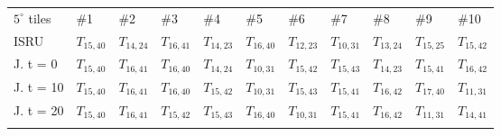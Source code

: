 \documentclass[utf8]{FrontiersinHarvard} %
\begin{document}
\begin{table}[h!]
\begin{tabular}{lllllllllll}
$5^{\circ}$ tiles  & \#1                                  & \#2                                  & \#3                                  & \#4                                  & \#5                                  & \#6                                  & \#7                                  & \#8                                  & \#9                                  & \#10                                 \\
ISRU               & \cellcolor[HTML]{00FF00}$T_{15,40}$  & \cellcolor[HTML]{88FF00}$T_{14,24}$  & \cellcolor[HTML]{B8FF00}$T_{16,41}$  & \cellcolor[HTML]{E8FF00}$T_{14,23}$  & \cellcolor[HTML]{FFFF00}$T_{16,40}$  & \cellcolor[HTML]{FFEE00}$T_{12,23}$  & \cellcolor[HTML]{FFDD00}$T_{10,31}$  & \cellcolor[HTML]{FFCC00}$T_{13,24}$  & \cellcolor[HTML]{FFBB00}$T_{15,25}$  & \cellcolor[HTML]{FFAA00}$T_{15,42}$  \\
J. t = 0           & \cellcolor[HTML]{00FF00}$T_{15,40}$  & \cellcolor[HTML]{B8FF00}$T_{16,41}$  & \cellcolor[HTML]{FFFF00}$T_{16,40}$  & \cellcolor[HTML]{88FF00}$T_{14,24}$  & \cellcolor[HTML]{FFDD00}$T_{10,31}$  & \cellcolor[HTML]{FFAA00}$T_{15,42}$  & $T_{15,43}$                          & \cellcolor[HTML]{E8FF00}$T_{14,23}$  & $T_{15,41}$                          & $T_{16,42}$                          \\
J. t = 10          & \cellcolor[HTML]{00FF00}$T_{15,40}$  & \cellcolor[HTML]{B8FF00}$T_{16,41}$  & \cellcolor[HTML]{FFFF00}$T_{16,40}$  & \cellcolor[HTML]{FFAA00}$T_{15,42}$  & \cellcolor[HTML]{FFDD00}$T_{10,31}$  & $T_{15,43}$                          & $T_{15,41}$                          & $T_{16,42}$                          & $T_{17,40}$                          & $T_{11,31}$                          \\
J. t = 20          & \cellcolor[HTML]{00FF00}$T_{15,40}$  & \cellcolor[HTML]{B8FF00}$T_{16,41}$  & \cellcolor[HTML]{FFAA00}$T_{15,42}$  & $T_{15,43}$                          & \cellcolor[HTML]{FFFF00}$T_{16,40}$  & \cellcolor[HTML]{FFDD00}$T_{10,31}$  & $T_{15,41}$                          & $T_{16,42}$                          & $T_{11,31}$                          & $T_{14,41}$                          \\
                   &                                      &                                      &                                      &                                      &                                      &                                      &                                      &                                      &                                      &                                      \\

\end{tabular}
\end{table}
\end{document}
